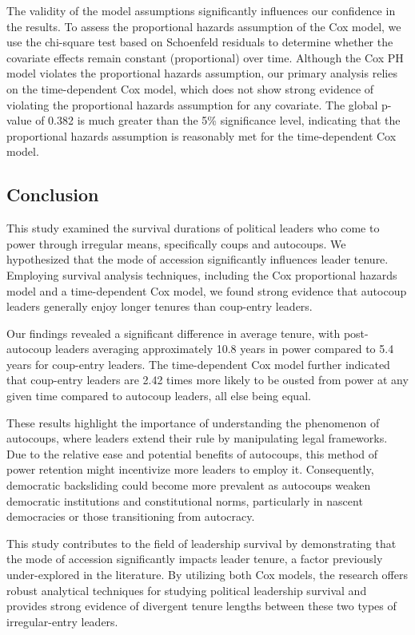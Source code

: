 \documentclass[
  12pt,
]{report}
\begin{document}
The validity of the model assumptions significantly influences our
confidence in the results. To assess the proportional hazards assumption
of the Cox model, we use the chi-square test based on Schoenfeld
residuals to determine whether the covariate effects remain constant
(proportional) over time. Although the Cox PH model violates the
proportional hazards assumption, our primary analysis relies on the
time-dependent Cox model, which does not show strong evidence of
violating the proportional hazards assumption for any covariate. The
global p-value of 0.382 is much greater than the 5\% significance level,
indicating that the proportional hazards assumption is reasonably met
for the time-dependent Cox model.

\subsection{Conclusion}\label{conclusion-2}

This study examined the survival durations of political leaders who come
to power through irregular means, specifically coups and autocoups. We
hypothesized that the mode of accession significantly influences leader
tenure. Employing survival analysis techniques, including the Cox
proportional hazards model and a time-dependent Cox model, we found
strong evidence that autocoup leaders generally enjoy longer tenures
than coup-entry leaders.

Our findings revealed a significant difference in average tenure, with
post-autocoup leaders averaging approximately 10.8 years in power
compared to 5.4 years for coup-entry leaders. The time-dependent Cox
model further indicated that coup-entry leaders are 2.42 times more
likely to be ousted from power at any given time compared to autocoup
leaders, all else being equal.

These results highlight the importance of understanding the phenomenon
of autocoups, where leaders extend their rule by manipulating legal
frameworks. Due to the relative ease and potential benefits of
autocoups, this method of power retention might incentivize more leaders
to employ it. Consequently, democratic backsliding could become more
prevalent as autocoups weaken democratic institutions and constitutional
norms, particularly in nascent democracies or those transitioning from
autocracy.

This study contributes to the field of leadership survival by
demonstrating that the mode of accession significantly impacts leader
tenure, a factor previously under-explored in the literature. By
utilizing both Cox models, the research offers robust analytical
techniques for studying political leadership survival and provides
strong evidence of divergent tenure lengths between these two types of
irregular-entry leaders.
\end{document}

